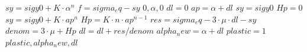 %
%
%
%
%
%



\begin{algorithmic}
\State $sy = sigy0 + K \cdot \alpha^{n}$
\State $f = sigma_eq - sy$
    \Return $0, \alpha, 0$
\EndIf
\State $dl = 0$
    \State $ap = \alpha + dl$
        \State $sy = sigy0$
        \State $Hp = 0$
    \Else
        \State $sy = sigy0 + K \cdot ap^{n}$
        \State $Hp = K \cdot n \cdot ap^{n - 1}$
    \EndIf
    \State $res = sigma_eq - 3 \cdot \mu \cdot dl - sy$
    \State $denom = 3 \cdot \mu + Hp$
    \State $dl = dl + res / denom$
\EndFor
\State $alpha_new = \alpha + dl$
\State $plastic = 1$
\Return $plastic, alpha_new, dl$
\end{algorithmic}
